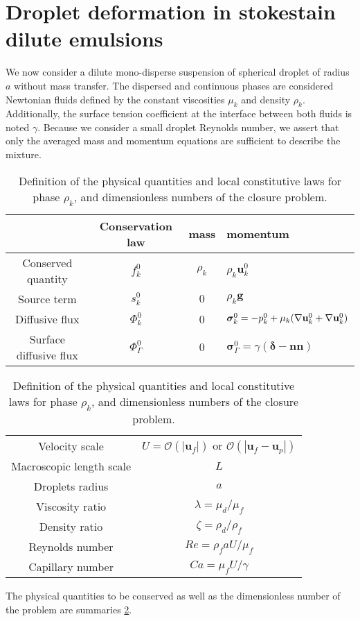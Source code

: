\section{Droplet deformation in stokestain dilute emulsions}




We now consider a dilute mono-disperse suspension of spherical droplet of radius $a$ without mass transfer. 
The dispersed  and continuous phases are considered Newtonian fluids defined by the constant viscosities $\mu_k$ and density $\rho_k$.
Additionally, the surface tension coefficient at the interface between both fluids is noted $\gamma$. 
Because we consider a small droplet Reynolds number, we assert that only the averaged mass and momentum equations are sufficient to describe the mixture. 
\begin{table}
    \centering
    \begin{tabular}{|c|ccl|}\hline
    & Conservation law & mass & momentum \\ \hline
    Conserved quantity & $f_k^0$  & $\rho_k$ & $\rho_k \textbf{u}_k^0$ \\
    Source term & $s_k^0$  & $0$ & $\rho_k \textbf{g}$ \\
    Diffusive flux & $\Phi_k^0$ & 0 & $\bm\sigma_k^0 = -p_k^0 + \mu_k (\mathbf{\nabla} \textbf{u}_k^0 + \mathbf{\nabla} \textbf{u}_k^0)$ \\
    Surface diffusive flux & $\Phi_\Gamma^0$ & 0 & $\bm\sigma_\Gamma^0 = \gamma (\bm\delta - \textbf{nn})$ \\\hline
    \end{tabular}
    \begin{tabular}{|c|c|}\hline\hline
    Velocity scale & $U = \mathcal{O}(|\textbf{u}_f|)$ or $\mathcal{O}(|\textbf{u}_f - \textbf{u}_p|)$ \\
    Macroscopic length scale & $L$ \\
    Droplets radius & $a$ \\
    Viscosity ratio & $\lambda = \mu_d / \mu_f$ \\
    Density ratio & $\zeta = \rho_d / \rho_f$ \\
    Reynolds number & $Re = \rho_f a U / \mu_f$   \\
    Capillary number & $Ca = \mu_f U / \gamma$ \\\hline
    \end{tabular}
    \caption{Definition of the physical quantities and local constitutive laws for phase $\rho_k$, and dimensionless numbers of the closure problem.}
    \label{tab:qte_Newtonian}
\end{table}
The physical quantities to be conserved as well as the dimensionless number of the problem are summaries \ref{tab:qte_Newtonian}. 

